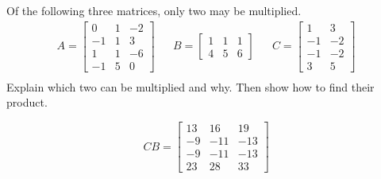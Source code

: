 
\begin{exerciseStatement}


Of the following three matrices, only two may be multiplied. 
\begin{align*} A= \left[\begin{array}{ccc}
0 & 1 & -2 \\
-1 & 1 & 3 \\
1 & 1 & -6 \\
-1 & 5 & 0
\end{array}\right]  & & B= \left[\begin{array}{ccc}
1 & 1 & 1 \\
4 & 5 & 6
\end{array}\right]  & & C= \left[\begin{array}{cc}
1 & 3 \\
-1 & -2 \\
-1 & -2 \\
3 & 5
\end{array}\right]  \\ \end{align*}
             Explain which two can be multiplied and why. Then show how to find their product.


\end{exerciseStatement}
    
\begin{exerciseAnswer} 
\[CB= \left[\begin{array}{ccc}
13 & 16 & 19 \\
-9 & -11 & -13 \\
-9 & -11 & -13 \\
23 & 28 & 33
\end{array}\right] \]
\end{exerciseAnswer}
    
